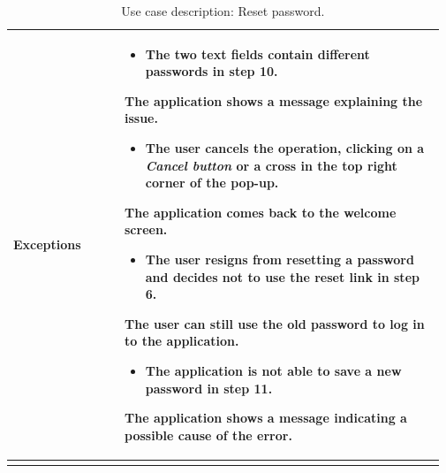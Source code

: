 \begin{longtable}{@{}p{0.25\linewidth} p{0.72\linewidth}@{}}
	\textbf{Exceptions}         & \begin{itemize}[leftmargin=.4cm,noitemsep,topsep=0pt,before=\vspace{-3mm}]
	   \item The two text fields contain different passwords in step 10.
	\end{itemize}
	The application shows a message explaining the issue.
    \begin{itemize}[leftmargin=.4cm,noitemsep,topsep=0pt]
	   \item The user cancels the operation, clicking on a \textit{Cancel button} or a cross in the top right corner of the pop-up.
	\end{itemize}
	The application comes back to the welcome screen.
    \begin{itemize}[leftmargin=.4cm,noitemsep,topsep=0pt]
	   \item The user resigns from resetting a password and decides not to use the reset link in step 6.
	\end{itemize}
	The user can still use the old password to log in to the application.
    \begin{itemize}[leftmargin=.4cm,noitemsep,topsep=0pt]
	   \item The application is not able to save a new password in step 11.
	\end{itemize}
	The application shows a message indicating a possible cause of the error.
	\\\bottomrule
	\caption{Use case description: Reset password.} 
\end{longtable}

